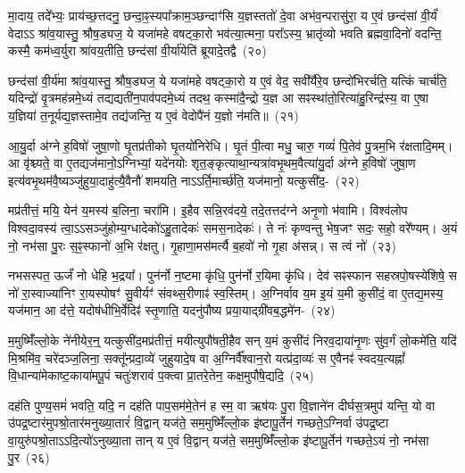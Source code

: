मा॒दाय॒ तदे᳚भ्यः॒ प्राय॑च्छ॒त्तदनु॒ छन्दा॒ꣴ॒स्यपा᳚क्राम॒ञ्छन्दाꣳ॑सि य॒ज्ञस्ततो॑ दे॒वा अभ॑व॒न्परासु॑रा॒ य ए॒वं छन्द॑सां वी॒र्यं॑ वेदा\-ऽऽ श्रा॑व॒यास्तु॒ श्रौष॒ड्यज॒ ये यजा॑महे वषट्का॒रो भव॑त्या॒त्मना॒ परा᳚\-ऽस्य॒ भ्रातृ॑व्यो भवति ब्रह्मवा॒दिनो॑ वदन्ति॒ कस्मै॒ कम॑ध्व॒र्युरा श्रा॑वय॒तीति॒ छन्द॑सां वी॒र्या॑येति॑ ब्रूयादे॒तद्वै~(२०)\ip

छन्द॑सां वी॒र्य॑मा श्रा॑व॒यास्तु॒ श्रौष॒ड्यज॒ ये यजा॑महे वषट्का॒रो य ए॒वं वेद॒ सवी᳚र्यैरे॒व छन्दो॑भिरर्चति॒ यत्किं चार्च॑ति॒ यदिन्द्रो॑ वृ॒त्रमह॑न्नमे॒ध्यं तद्यद्यती॑न॒पाव॑पदमे॒ध्यं तदथ॒ कस्मा॑दै॒न्द्रो य॒ज्ञ आ सꣴस्था॑तो॒रित्या॑हु॒रिन्द्र॑स्य॒ वा ए॒षा य॒ज्ञिया॑ त॒नूर्यद्य॒ज्ञस्तामे॒व तद्य॑जन्ति॒ य ए॒वं वेदोपै॑नं य॒ज्ञो न॑मति॥~(२१)\ip

{\anuvakamend[{स छन्द॑सां वी॒र्यं॑ वा ए॒व तद॒ष्टौ च॑}]}

आ॒यु॒र्दा अ॑ग्ने ह॒विषो॑ जुषा॒णो घृ॒तप्र॑तीको घृ॒तयो॑निरेधि। घृ॒तं पी॒त्वा मधु॒ चारु॒ गव्यं॑ पि॒तेव॑ पु॒त्रम॒भि र॑क्षतादि॒मम्। आ वृ॑श्च्यते॒ वा ए॒तद्यज॑मानो॒\-ऽग्निभ्यां॒ यदे॑नयोः शृत॒ङ्कृत्याथा॒न्यत्रा॑वभृ॒थम॒वैत्या॑यु॒र्दा अ॑ग्ने ह॒विषो॑ जुषा॒ण इत्य॑वभृ॒थम॑वै॒ष्यञ्जु॑हुया॒दाहु॑त्यै॒वैनौ॑ शमयति॒ नाऽऽर्ति॒मार्च्छ॑ति॒ यज॑मानो॒ यत्कुसी॑द॒-~(२२)\ip

मप्र॑तीत्तं॒ मयि॒ येन॑ य॒मस्य॑ ब॒लिना॒ चरा॑मि। इ॒हैव सन्नि॒रव॑दये॒ तदे॒तत्तद॑ग्ने अनृ॒णो भ॑वामि। विश्व॑लोप विश्वदा॒वस्य॑ त्वा॒\-ऽऽ\-सञ्जु॑होम्य॒ग्धादेको॑\-ऽहु॒तादेकः॑ समस॒नादेकः॑। ते नः॑ कृण्वन्तु भेष॒जꣳ सदः॒ सहो॒ वरे᳚ण्यम्। अ॒यं नो॒ नभ॑सा पु॒रः स॒ꣴ॒स्फानो॑ अ॒भि र॑क्षतु। गृ॒हाणा॒मस॑मर्त्यै ब॒हवो॑ नो गृ॒हा अ॑सन्न्। स त्वं नो॑~(२३)\ip

नभसस्पत॒ ऊर्जं॑ नो धेहि भ॒द्रया᳚। पुन॑र्नो न॒ष्टमा कृ॑धि॒ पुन॑र्नो र॒यिमा कृ॑धि। देव॑ सꣴस्फान सहस्रपो॒षस्ये॑शिषे॒ स नो॑ रा॒स्वाज्या॑निꣳ रा॒यस्पोषꣳ॑ सु॒वीर्यꣳ॑ संवथ्स॒रीणाꣴ॑ स्व॒स्तिम्। अ॒ग्निर्वाव य॒म इ॒यं य॒मी कुसी॑दं॒ वा ए॒तद्य॒मस्य॒ यज॑मान॒ आ द॑त्ते॒ यदोष॑धीभि॒र्वेदिꣴ॑ स्तृ॒णाति॒ यदनु॑पौष्य प्रया॒याद्ग्री॑वब॒द्धमे॑न-~(२४)\ip

म॒मुष्मिँ॑ल्लो॒के ने॑नीयेर॒न्॒ यत्कुसी॑द॒मप्र॑तीत्तं॒ मयीत्युपौ॑षती॒हैव सन् य॒मं कुसी॑दं निरव॒दाया॑नृ॒णः सु॑व॒र्गं लो॒कमे॑ति॒ यदि॑ मि॒श्रमि॑व॒ चरे॑दञ्ज॒लिना॒ सक्तू᳚न्प्रदा॒व्ये॑ जुहुयादे॒ष वा अ॒ग्निर्वै᳚श्वान॒रो यत्प्र॑दा॒व्यः॑ स ए॒वैनꣴ॑ स्वदय॒त्यह्नां᳚ वि॒धान्या॑मेकाष्ट॒काया॑मपू॒पं चतुः॑शरावं प॒क्त्वा प्रा॒तरे॒तेन॒ कक्ष॒मुपौ॑षे॒द्यदि॒~(२५)\ip

दह॑ति पुण्य॒समं॑ भवति॒ यदि॒ न दह॑ति पाप॒सम॑मे॒तेन॑ ह स्म॒ वा ऋष॑यः पु॒रा वि॒ज्ञाने॑न दीर्घस॒त्रमुप॑ यन्ति॒ यो वा उ॑पद्र॒ष्टार॑मुपश्रो॒तार॑मनुख्या॒तारं॑ वि॒द्वान् यज॑ते॒ सम॒मुष्मिँ॑ल्लो॒क इ॑ष्टापू॒र्तेन॑ गच्छते॒\-ऽग्निर्वा उ॑पद्र॒ष्टा वा॒युरु॑पश्रो॒ता\-ऽऽ\-\-दि॒त्यो॑\-ऽनुख्या॒ता तान् य ए॒वं वि॒द्वान् यज॑ते॒ सम॒मुष्मिँ॑ल्लो॒क इ॑ष्टापू॒र्तेन॑ गच्छते॒\-ऽयं नो॒ नभ॑सा पु॒र~(२६)\ip

